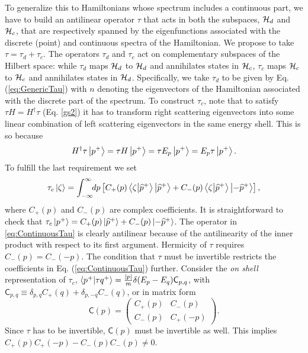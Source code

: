 To generalize this to Hamiltonians whose spectrum includes a continuous part, we have to build an antilinear operator $\tau$ that acts in both the subspaces, ${\cal H}_d$ and ${\cal H}_c$, that are respectively spanned by the eigenfunctions associated with the discrete (point) and continuous spectra of the Hamiltonian. We propose to take $\tau= \tau_d + \tau_c$. The operators $\tau_d$ and $\tau_c$ act on complementary subspaces of the Hilbert space: while $\tau_d$ maps ${\cal H}_d$ to ${\cal H}_d$ and annihilates states in ${\cal H}_c$,   $\tau_c$ maps ${\cal H}_c$ to ${\cal H}_c$ and annihilates states in ${\cal H}_d$.
Specifically, we take $\tau_d$ to be given by Eq. (\ref{eq:GenericTau}) with  $n$ denoting the eigenvectors of the Hamiltonian associated with the discrete part of the spectrum. To construct $\tau_c$, note that to satisfy $\tau H = H^\dagger \tau$ (Eq. \eqref{gs2}) it has to transform right scattering eigenvectors into some linear combination of left scattering eigenvectors in the same energy shell. This is so because
%
\begin{equation}
    H^\dagger \tau \ket{p^+} = \tau H \ket{p^+}
    = \tau E_p\ket{p^+}
    = E_p \tau \ket{p^+}.
\end{equation}
%
To fulfill the last requirement we set
%
\begin{equation}
    \tau_c \ket{\zeta} = \int_{-\infty}^{\infty}\!\! dp  \left[ C_+(p) \braket{\zeta}{\widehat{p}^+}\ket{\widehat{p}^+} + C_-(p)\braket{\zeta}{\widehat{p}^+}\ket{-\widehat{p}^+} \right],
    \label{eq:ContinuousTau}
\end{equation}
%
where $C_+(p)$ and $C_-(p)$ are complex coefficients. It is straightforward to check that $\tau_c \ket{p^+} = C_+(p)\ket{\widehat{p}^+} + C_-(p)\ket{-\widehat{p}^+}$.
The operator in \eqref{eq:ContinuousTau} is clearly antilinear because of the antilinearity of the inner product with respect to its first argument. Hermicity of $\tau$ requires $C_-(p) = C_-(-p)$. The condition that $\tau$ must be invertible restricts the coefficients in Eq. (\ref{eq:ContinuousTau}) further.
Consider the \textit{on shell} representation of $\tau_c$, $\braket{p^+}{\tau q^+} = \frac{|p|}{m}\delta(E_p-E_q) \mathsf{C}_{p,q}$, with $\mathsf{C}_{p,q} \equiv \delta_{p,q} C_+(q) + \delta_{p,-q} C_-(q)$, or in matrix form
%
\begin{equation}
\mathsf{C}(p)=
    \begin{pmatrix}
    C_+(p) & C_-(p) \\
    C_-(p) & C_+(-p)
    \end{pmatrix}.
\end{equation}
%
Since $\tau$ has to be invertible, $\mathsf{C}(p)$ must be invertible as well. This implies  $C_+(p)C_+(-p) - C_-(p)C_-(p) \neq 0$.


